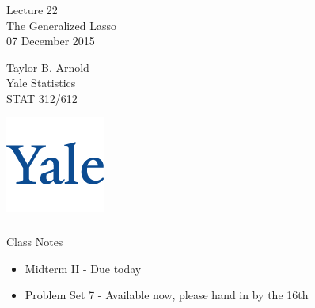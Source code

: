 



\begin{frame}[fragile] \frametitle{}

\vfill

{\fontsize{0.7cm}{0cm}\selectfont Lecture 22 \\\vspace{0.2cm}
The Generalized Lasso}\\\vspace{0.5cm}
07 December 2015

\vspace{2cm}

\begin{minipage}{0.6\textwidth}
Taylor B. Arnold \\
Yale Statistics  \\
STAT 312/612
\end{minipage}
\hfill
\begin{minipage}{0.3\textwidth}\raggedleft
\includegraphics[scale=0.3]{../yale-logo.png}
\end{minipage}%

\end{frame}

\begin{frame}[fragile] \frametitle{}

{\color{yaleblue}\fontsize{16pt}{20pt}\selectfont Class Notes}

\begin{itemize}
\item Midterm II - Due today
\item Problem Set 7 - Available now, please hand in by the 16th
\end{itemize}

\end{frame}

